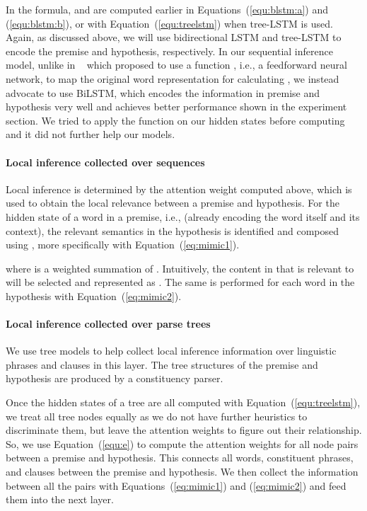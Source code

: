\documentclass[11pt,a4paper]{article}
\begin{document}
In the formula,  and  are computed earlier in Equations~(\ref{equ:blstm:a}) and (\ref{equ:blstm:b}), or with Equation~(\ref{equ:treelstm}) when tree-LSTM is used. Again, as discussed above, we will use  bidirectional LSTM and tree-LSTM to encode the premise and hypothesis, respectively. In our sequential inference model, unlike in ~\citet{Parikh:D16-1244} which proposed to use a function , i.e., a feedforward neural network, to map the original word representation for calculating , we instead advocate to use BiLSTM, which encodes the information in premise and hypothesis very well and achieves better performance shown in the experiment section. We tried to apply the  function on our hidden states before computing  and it did not further help our models. 

\paragraph{Local inference collected over sequences}

Local inference is determined by the attention weight  computed above, which is used to obtain the local relevance between a premise and hypothesis. For the hidden state of a word in a premise, i.e.,  (already encoding the word itself and its context), the relevant semantics in the hypothesis is identified and composed using , more specifically with Equation~(\ref{eq:mimic1}).
{\fontsize{10pt}{1.0cm}
	
}

\noindent where  is a weighted summation of . Intuitively, the content in  that is relevant to  will be selected and represented as . The same is performed for each word in the hypothesis with Equation~(\ref{eq:mimic2}).

\paragraph{Local inference collected over parse trees}
We use tree models to help collect local inference information over linguistic phrases and clauses in this layer. 
The tree structures of the premise and hypothesis are produced by a constituency parser. 

Once the hidden states of a tree are all computed with Equation~(\ref{equ:treelstm}), we treat all tree nodes equally as we do not have further heuristics to discriminate them, but leave the attention weights to figure out their relationship. So, we use Equation~(\ref{equ:e}) to compute the attention weights for all node pairs between a premise and hypothesis. This connects all words, constituent phrases, and clauses between the premise and hypothesis. We then collect the information between all the pairs with Equations~(\ref{eq:mimic1}) and (\ref{eq:mimic2}) and feed them into the next layer.  
\end{document}

